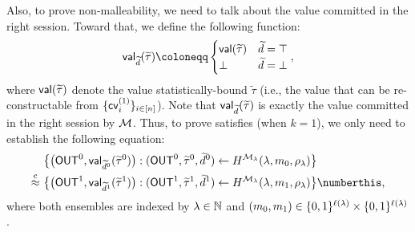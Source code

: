 Also, to prove non-malleability, we need to talk about the value committed in the right session. Toward that, we define the following function:
$$
\msf{val}_{\tilde{d}}(\tilde{\tau}) \coloneqq 
\begin{cases}
\msf{val}(\tilde{\tau}) & \tilde{d} = \top\\
\bot & \tilde{d} = \bot
\end{cases},
$$
where $\mathsf{val}(\widetilde{\tau})$ denote the value statistically-bound $\tilde{\tau}$ (i.e., the value that can be re-constructable from $\{\mathsf{cv}^{(1)}_i\}_{i \in [n]}$). Note that $\mathsf{val}_{\widetilde{d}}(\widetilde{\tau})$ is exactly the value committed in the right session by $\mathcal{M}$. Thus, to prove satisfies  (when $k = 1$), we only need to establish the following equation:
\begin{align*}
&\big\{\big(\OUT^0, \msf{val}_{\tilde{d}^0}(\tilde{\tau}^0)\big): (\OUT^0, \tilde{\tau}^0, \tilde{d}^0) \gets H^{\mcal{M}_\secpar}(\secpar, m_0, \rho_\secpar) \big\} \\
\cind ~& 
\big\{\big(\OUT^1, \msf{val}_{\tilde{d}^1}(\tilde{\tau}^1)\big): (\OUT^1, \tilde{\tau}^1, \tilde{d}^1) \gets H^{\mcal{M}_\secpar}(\secpar, m_1, \rho_\secpar) \big\} \numberthis \label{pq:eq:classical:H:m-0:m-1},
\end{align*}
where both ensembles are indexed by $\lambda \in \mathbb{N}$ and $(m_0, m_1) \in \{0,1\}^{\ell(\lambda)} \times \{0,1\}^{\ell(\lambda)}$.

